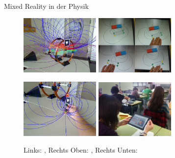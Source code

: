 \begin{frame}[fragile]{Mixed Reality in der Physik}

\begin{figure}
	\includegraphics[width=0.35\textwidth]{images/papers/Buchau09.jpg}
	\hspace{0.05cm}
	\includegraphics[width=0.35\textwidth]{images/papers/Matsutomo13.jpg}

	\includegraphics[width=0.35\textwidth]{images/papers/Buchau09_Magnet.jpg}
	\hspace{0.05cm}
	\includegraphics[width=0.35\textwidth]{images/papers/Ibanez14.jpg}

	\setlength{\abovecaptionskip}{5pt plus 5pt minus 2pt}
	\caption*{Links: \citep{Buchau09}, Rechts Oben: \cite{Matsutomo13}, Rechts Unten: \cite{Ibanez14}}
\end{figure}
\end{frame}

